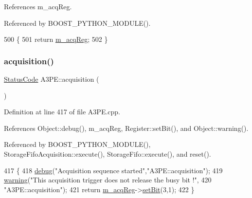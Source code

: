 References m\+\_\+acq\+Reg.



Referenced by B\+O\+O\+S\+T\+\_\+\+P\+Y\+T\+H\+O\+N\+\_\+\+M\+O\+D\+U\+L\+E().


\begin{DoxyCode}
500                     \{
501     \textcolor{keywordflow}{return} \hyperlink{classA3PE_abaf426f4c9192537117b77f9f4821e04}{m\_acqReg};
502   \}
\end{DoxyCode}
\mbox{\label{classA3PE_a035886b99761cc4f3c342ff0b4e44f59}} 
\subsubsection{\texorpdfstring{acquisition()}{acquisition()}}
{\footnotesize\ttfamily \hyperlink{classStatusCode}{Status\+Code} A3\+P\+E\+::acquisition (\begin{DoxyParamCaption}{ }\end{DoxyParamCaption})}



Definition at line 417 of file A3\+P\+E.\+cpp.



References Object\+::debug(), m\+\_\+acq\+Reg, Register\+::set\+Bit(), and Object\+::warning().



Referenced by B\+O\+O\+S\+T\+\_\+\+P\+Y\+T\+H\+O\+N\+\_\+\+M\+O\+D\+U\+L\+E(), Storage\+Fifo\+Acquisition\+::execute(), Storage\+Fifo\+::execute(), and reset().


\begin{DoxyCode}
417                             \{
418   \hyperlink{classObject_aac010553f022165573714b7014a15f0d}{debug}(\textcolor{stringliteral}{"Acquisition sequence started"},\textcolor{stringliteral}{"A3PE::acquisition"});
419   \hyperlink{classObject_a65cd4fda577711660821fd2cd5a3b4c9}{warning}(\textcolor{stringliteral}{"This acquisition trigger does not release the busy bit !"},
420       \textcolor{stringliteral}{"A3PE::acquisition"});
421   \textcolor{keywordflow}{return} \hyperlink{classA3PE_abaf426f4c9192537117b77f9f4821e04}{m\_acqReg}->\hyperlink{classRegister_ab094246dd12aa7e0aa0ca917f4e70b31}{setBit}(3,1);
422 \}
\end{DoxyCode}
\mbox{\label{classA3PE_a81e32c82ca14f85fd7f26cd9a54f7a38}} 
